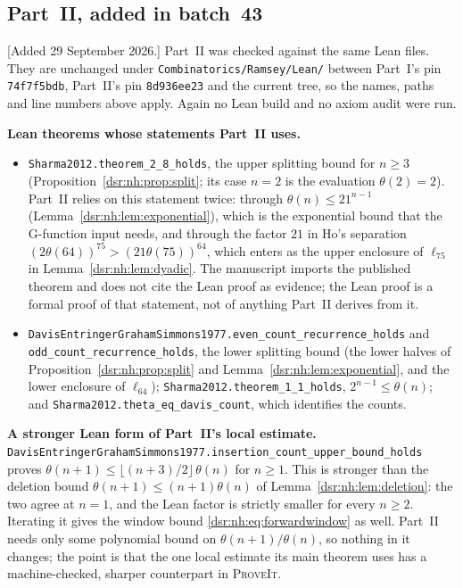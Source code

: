 \documentclass[11pt,a4paper]{article}
\numberwithin{equation}{section}
\theoremstyle{definition}
\theoremstyle{remark}
\newcommand{\repo}{\textsc{ProveIt}}
\newcommand{\lean}[1]{\nolinkurl{#1}}
\theoremstyle{definition}
\theoremstyle{plain}
\begin{document}
\subsection{Part~II, added in batch~43}
\label{dsr:nh:sec:formal}
[Added 29 September 2026.] Part~II was checked against the same Lean files.
They are unchanged under \lean{Combinatorics/Ramsey/Lean/} between Part~I's
pin \lean{74f7f5bdb}, Part~II's pin \lean{8d936ee23} and the current tree,
so the names, paths and line numbers above apply. Again no Lean build and
no axiom audit were run.

\medskip\noindent\textbf{Lean theorems whose statements Part~II uses.}
\begin{itemize}[leftmargin=*,itemsep=3pt]\raggedright
\item \lean{Sharma2012.theorem_2_8_holds}, the upper splitting bound for
 $n\ge3$ (Proposition~\ref{dsr:nh:prop:split}; its case $n=2$ is the
 evaluation $\theta(2)=2$). Part~II relies on this statement twice: through
 $\theta(n)\le21^{n-1}$ (Lemma~\ref{dsr:nh:lem:exponential}), which is the
 exponential bound that the G-function input needs, and through the factor
 $21$ in Ho's separation $(2\theta(64))^{75}>(21\theta(75))^{64}$, which
 enters as the upper enclosure of $\ell_{75}$ in
 Lemma~\ref{dsr:nh:lem:dyadic}. The manuscript imports the published
 theorem and does not cite the Lean proof as evidence; the Lean proof is a
 formal proof of that statement, not of anything Part~II derives from it.
\item \lean{DavisEntringerGrahamSimmons1977.even_count_recurrence_holds}
 and \lean{odd_count_recurrence_holds}, the lower splitting bound (the
 lower halves of Proposition~\ref{dsr:nh:prop:split} and
 Lemma~\ref{dsr:nh:lem:exponential}, and the lower enclosure of
 $\ell_{64}$); \lean{Sharma2012.theorem_1_1_holds}, $2^{n-1}\le\theta(n)$;
 and \lean{Sharma2012.theta_eq_davis_count}, which identifies the counts.
\end{itemize}

\medskip\noindent\textbf{A stronger Lean form of Part~II's local estimate.}
\lean{DavisEntringerGrahamSimmons1977.insertion_count_upper_bound_holds}
proves $\theta(n+1)\le\lfloor(n+3)/2\rfloor\,\theta(n)$ for $n\ge1$. This is
stronger than the deletion bound $\theta(n+1)\le(n+1)\theta(n)$ of
Lemma~\ref{dsr:nh:lem:deletion}: the two agree at $n=1$, and the Lean
factor is strictly smaller for every $n\ge2$. Iterating it gives the
window bound \eqref{dsr:nh:eq:forwardwindow} as well. Part~II needs only
some polynomial bound on $\theta(n+1)/\theta(n)$, so nothing in it
changes; the point is that the one local estimate its main theorem uses has
a machine-checked, sharper counterpart in \repo.
\end{document}
